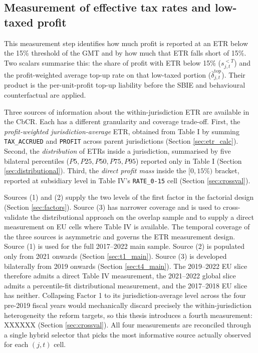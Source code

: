 \documentclass[11pt,a4paper]{article}
\newcommand{\code}[1]{\texttt{#1}}
\begin{document}
\subsection{Measurement of effective tax rates and low-taxed profit}\label{sec:etr_measurement}

This measurement step identifies how much profit is reported at an ETR below the 15\% threshold of the GMT and by how much that ETR falls short of 15\%. Two scalars summarise this: the share of profit with ETR below 15\% ($s_{j,t}^{<T}$) and the profit-weighted average top-up rate on that low-taxed portion ($\bar{\delta}_{j,t}^{\text{top}}$). Their product is the per-unit-profit top-up liability before the SBIE and behavioural counterfactual are applied.

Three sources of information about the within-jurisdiction ETR are available in the CbCR. Each has a different granularity and coverage trade-off. First, the \emph{profit-weighted jurisdiction-average} ETR, obtained from Table I by summing \code{TAX\_ACCRUED} and \code{PROFIT} across parent jurisdictions (Section \ref{sec:etr_calc}). Second, the \emph{distribution} of ETRs inside a jurisdiction, summarised by five bilateral percentiles ($P5, P25, P50, P75, P95$) reported only in Table I (Section \ref{sec:distributional}). Third, the \emph{direct profit mass} inside the $[0, 15\%)$ bracket, reported at subsidiary level in Table IV's \code{RATE\_0-15} cell (Section \ref{sec:crossval}).

Sources (1) and (2) supply the two levels of the first factor in the factorial design (Section \ref{sec:factors}). Source (3) has narrower coverage and is used to cross-validate the distributional approach on the overlap sample and to supply a direct measurement on EU cells where Table IV is available. The temporal coverage of the three sources is asymmetric and governs the ETR measurement design. Source (1) is used for the full 2017--2022 main sample. Source (2) is populated only from 2021 onwards (Section \ref{sec:t1_main}). Source (3) is developed bilaterally from 2019 onwards (Section \ref{sec:t4_main}). The 2019--2022 EU slice therefore admits a direct Table IV measurement, the 2021--2022 global slice admits a percentile-fit distributional measurement, and the 2017--2018 EU slice has neither. Collapsing Factor 1 to its jurisdiction-average level across the four pre-2019 fiscal years would mechanically discard precisely the within-jurisdiction heterogeneity the reform targets, so this thesis introduces a fourth measurement: XXXXXX (Section \ref{sec:crossval}). All four measurements are reconciled through a single hybrid selector that picks the most informative source actually observed for each $(j,t)$ cell.
\end{document}
